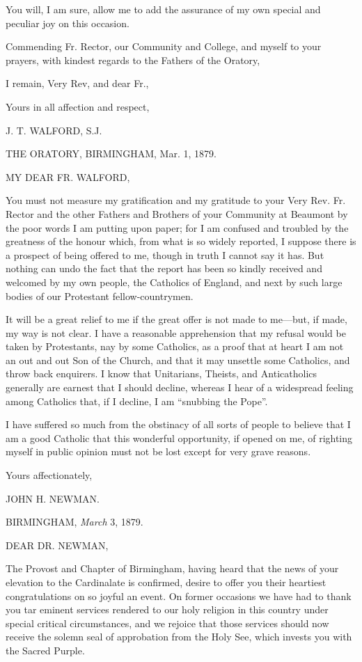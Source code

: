 You will, I am sure, allow me to add the assurance of my own
special and peculiar joy on this occasion.

Commending Fr. Rector, our Community and College, and myself to
your prayers, with kindest regards to the Fathers of the Oratory,

I remain, Very Rev, and dear Fr.,

Yours in all affection and respect,

J. T. WALFORD, S.J.


THE ORATORY, BIRMINGHAM,
Mar. 1, 1879.

MY DEAR FR.
WALFORD,

You must not measure my gratification and my gratitude to your Very Rev. Fr. Rector and the other Fathers and Brothers of your
Community at Beaumont by the poor words I am putting upon paper; for I
am confused and troubled by the greatness of the honour which, from
what is so widely reported, I suppose there is a prospect of being
offered to me, though in truth I cannot say it has. But nothing can
undo the fact that the report has been so kindly received and welcomed
by my own people, the Catholics of England, and next by such large
bodies of our Protestant fellow-countrymen.

It will be a great relief to me if the great offer is not made to
me—but, if made, my way is not clear. I have a reasonable
apprehension that my refusal would be taken by Protestants, nay by
some Catholics, as a proof that at heart I am not an out and out Son
of the Church, and that it may unsettle some Catholics, and throw back
enquirers. I know that Unitarians, Theists, and Anticatholics
generally are earnest that I should decline, whereas I hear of a
widespread feeling among Catholics that, if I decline, I am
``snubbing the Pope''.

I have suffered so much from the obstinacy of all sorts of
people to believe that I am a good Catholic that this wonderful
opportunity, if opened on me, of righting myself in public opinion
must not be lost except for very grave reasons.

Yours affectionately,

JOHN H. NEWMAN.


BIRMINGHAM, \emph{March} 3, 1879.

DEAR DR. NEWMAN,

The Provost and Chapter of Birmingham, having heard that the news of
your elevation to the Cardinalate is confirmed, desire to offer you
their heartiest congratulations on so joyful an event. On former
occasions we have had to thank you tar eminent services rendered to
our holy religion in this country under special critical
circumstances, and we rejoice that those services should now receive
the solemn seal of approbation from the Holy See, which invests you
with the Sacred Purple.

